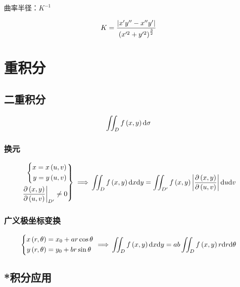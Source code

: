 \documentclass{article}
\begin{document}
曲率半径：$K^{-1}$

\[K=\frac{\left|x^\prime y^{\prime\prime}-x^{\prime\prime}y^\prime\right|}{\left(x^{\prime2}+y^{\prime2}\right)^\frac32}\]

\section{重积分}

\subsection{二重积分}

\begin{definition}[$\d\sigma=\d x\d y$]
    \[\iint_Df\left(x,y\right)\mathrm d\sigma\]
\end{definition}

\subsubsection{换元}

\[\left.\begin{aligned}
        \left\{\begin{aligned}
                   x=x\left(u,v\right) \\
                   y=y\left(u,v\right)
               \end{aligned}\right. \\
        \left.\frac{\partial\left(x,y\right)}{\partial\left(u,v\right)}\right|_{D^\prime}\neq0
    \end{aligned}\right\}\implies\\
    \iint_Df\left(x,y\right)\mathrm d x\mathrm d y=
    \iint_{D^\prime}f\left(x,y\right)\left|\frac{\partial\left(x,y\right)}{\partial\left(u,v\right)}\right|\mathrm d u\mathrm d v\]

\subsubsection{广义极坐标变换}

\[\left\{\begin{aligned}
        x\left(r,\theta\right) & =x_0+ar\cos\theta \\
        y\left(r,\theta\right) & =y_0+br\sin\theta
    \end{aligned}\right.\implies\\
    \iint_Df\left(x,y\right)\mathrm d x\mathrm d y=
    ab\iint_Df\left(x,y\right)r\mathrm d r\mathrm d\theta\]

\subsection{*积分应用}
\end{document}

